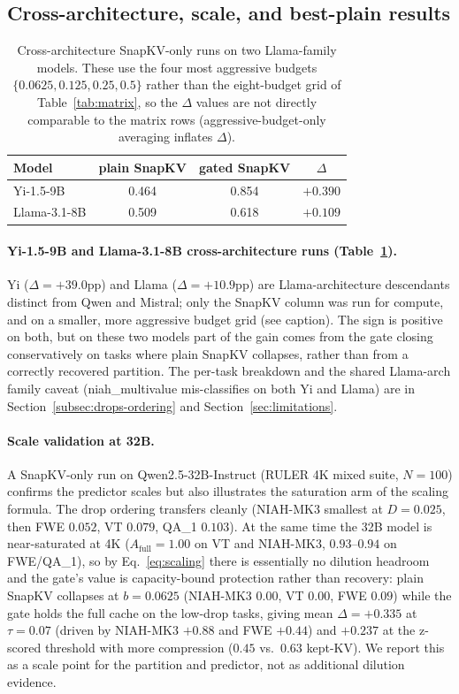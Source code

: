 \documentclass{article}
\begin{document}
\subsection{Cross-architecture, scale, and best-plain results}

\begin{table}[t]
\centering
\caption{Cross-architecture SnapKV-only runs on two Llama-family models.
These use the four most aggressive budgets $\{0.0625, 0.125, 0.25, 0.5\}$
rather than the eight-budget grid of Table~\ref{tab:matrix}, so the
$\Delta$ values are not directly comparable to the matrix rows
(aggressive-budget-only averaging inflates $\Delta$).}
\label{tab:crossarch}
\begin{tabular}{lccc}
\toprule
Model & plain SnapKV & gated SnapKV & $\Delta$ \\
\midrule
Yi-1.5-9B    & 0.464 & 0.854 & $+0.390$ \\
Llama-3.1-8B & 0.509 & 0.618 & $+0.109$ \\
\bottomrule
\end{tabular}
\end{table}

\paragraph{Yi-1.5-9B and Llama-3.1-8B cross-architecture runs
(Table~\ref{tab:crossarch}).} Yi
($\Delta = +39.0$pp) and Llama ($\Delta = +10.9$pp) are
Llama-architecture descendants distinct from Qwen and Mistral; only
the SnapKV column was run for compute, and on a smaller, more
aggressive budget grid (see caption). The sign is positive on both,
but on these two models part of the gain comes from the gate closing
conservatively on tasks where plain SnapKV collapses, rather than from
a correctly recovered partition. The per-task breakdown and the
shared Llama-arch family caveat (niah\_multivalue mis-classifies on
both Yi and Llama) are in Section~\ref{subsec:drops-ordering} and
Section~\ref{sec:limitations}.

\paragraph{Scale validation at 32B.} A SnapKV-only run on
Qwen2.5-32B-Instruct (RULER 4K mixed suite, $N = 100$) confirms the
predictor scales but also illustrates the saturation arm of the scaling
formula. The drop ordering transfers cleanly (NIAH-MK3 smallest at
$D = 0.025$, then FWE $0.052$, VT $0.079$, QA\_1 $0.103$). At the same
time the 32B model is near-saturated at 4K ($A_{\mathrm{full}} = 1.00$
on VT and NIAH-MK3, $0.93$--$0.94$ on FWE/QA\_1), so by
Eq.~\eqref{eq:scaling} there is essentially no dilution headroom and the
gate's value is capacity-bound protection rather than recovery: plain
SnapKV collapses at $b = 0.0625$ (NIAH-MK3 $0.00$, VT $0.00$, FWE
$0.09$) while the gate holds the full cache on the low-drop tasks,
giving mean $\Delta = +0.335$ at $\tau = 0.07$ (driven by NIAH-MK3
$+0.88$ and FWE $+0.44$) and $+0.237$ at the z-scored threshold with
more compression ($0.45$ vs.\ $0.63$ kept-KV). We report this as a
scale point for the partition and predictor, not as additional dilution
evidence.
\end{document}
